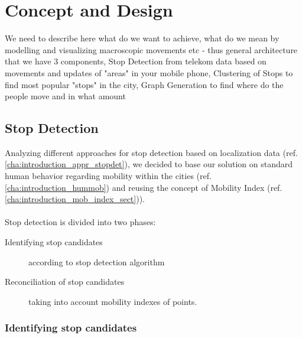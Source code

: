 \chapter{Concept and Design}
\label{cha:conceptanddesign}

We need to describe here what do we want to achieve, what do we mean by modelling and visualizing macroscopic movements etc - thus general architecture that we have 3 components, Stop Detection from telekom data based on movements and updates of "areas" in your mobile phone, Clustering of Stops to find most popular "stops" in the city, Graph Generation to find where do the people move and in what amount

\section{Stop Detection}

Analyzing different approaches for stop detection based on localization data (ref. \autoref{cha:introduction_appr_stopdet}), we decided to base our solution on standard human behavior regarding mobility within the cities (ref. \autoref{cha:introduction_hummob}) and reusing the concept of Mobility Index (ref. \autoref{cha:introduction_mob_index_sect})).
\\\\
Stop detection is divided into two phases:
\begin{description}
	\item[Identifying stop candidates] according to stop detection algorithm
	\item[Reconciliation of stop candidates] taking into account mobility indexes of points. 
\end{description}

\subsection{Identifying stop candidates}

